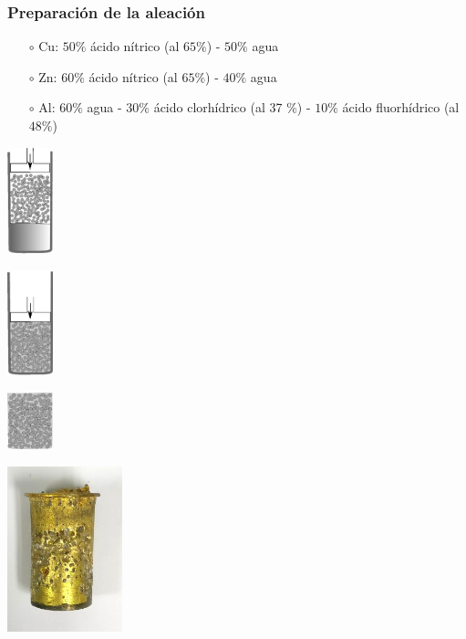 \documentclass[usenames,dvipsnames]{beamer}
\begin{document}
\begin{frame}
 
 \frametitle{Preparación de la aleación}
 
 \begin{itemize}
 \item[$\circ$] Cu: $50 \%$ ácido nítrico (al $65 \%$) - $50 \%$ agua
 \item[$\circ$] Zn: $60 \%$ ácido nítrico (al $65 \%$) - $40 \%$ agua
 \item[$\circ$] Al: $60 \%$ agua - $30 \%$ ácido clorhídrico (al 37 \%) - $10 \%$ ácido fluorhídrico (al $48 \%$)
\end{itemize}
\end{frame}

\begin{frame}
\begin{center}
\begin{multicols}{3}
 
\includegraphics[width=0.1\textwidth]{img/proceso/proceso1.eps}


\includegraphics[width=0.1\textwidth]{img/proceso/proceso2.eps}


\includegraphics[width=0.1\textwidth]{img/proceso/proceso3.eps}
\end{multicols}

\begin{multicols}{3}

\includegraphics[width=0.25\textwidth]{img/proceso/proceso1.jpg}


\end{multicols}
\end{center}
\end{frame}
\end{document}
